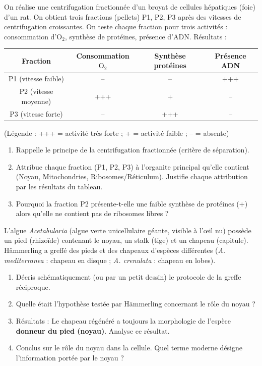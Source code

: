 \documentclass[11pt]{article}
\begin{document}
\begin{exercice}
On réalise une centrifugation fractionnée d'un broyat de cellules hépatiques (foie) d'un rat. On obtient trois fractions (pellets) P1, P2, P3 après des vitesses de centrifugation croissantes. On teste chaque fraction pour trois activités : consommation d'$\text{O}_2$, synthèse de protéines, présence d'ADN. Résultats :
\begin{center}
\begin{tabular}{|c|c|c|c|}\hline
\textbf{Fraction} & \textbf{Consommation $\text{O}_2$} & \textbf{Synthèse protéines} & \textbf{Présence ADN} \\ \hline
P1 (vitesse faible) & -- & -- & +++ \\ \hline
P2 (vitesse moyenne) & +++ & + & -- \\ \hline
P3 (vitesse forte) & -- & +++ & -- \\ \hline
\end{tabular}
\end{center}
(Légende : +++ = activité très forte ; + = activité faible ; -- = absente)
\begin{enumerate}
    \item Rappelle le principe de la centrifugation fractionnée (critère de séparation).
    \item Attribue chaque fraction (P1, P2, P3) à l'organite principal qu'elle contient (Noyau, Mitochondries, Ribosomes/Réticulum). Justifie chaque attribution par les résultats du tableau.
    \item Pourquoi la fraction P2 présente-t-elle une faible synthèse de protéines (+) alors qu'elle ne contient pas de ribosomes libres ?
\end{enumerate}
\end{exercice}

\begin{exercice}
L'algue \emph{Acetabularia} (algue verte unicellulaire géante, visible à l'œil nu) possède un pied (rhizoïde) contenant le noyau, un stalk (tige) et un chapeau (capitule). Hämmerling a greffé des pieds et des chapeaux d'espèces différentes (\emph{A. mediterranea} : chapeau en disque ; \emph{A. crenulata} : chapeau en lobes).
\begin{enumerate}
    \item Décris schématiquement (ou par un petit dessin) le protocole de la greffe réciproque.
    \item Quelle était l'hypothèse testée par Hämmerling concernant le rôle du noyau ?
    \item Résultats : Le chapeau régénéré a toujours la morphologie de l'espèce \textbf{donneur du pied (noyau)}. Analyse ce résultat.
    \item Conclus sur le rôle du noyau dans la cellule. Quel terme moderne désigne l'information portée par le noyau ?
\end{enumerate}
\end{exercice}
\end{document}
